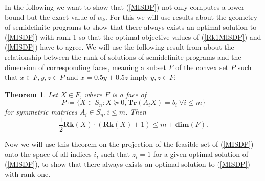 \documentclass[a4paper,11pt,1p]{elsarticle}
\newtheorem{thm}{Theorem}
\newcommand{\define}{\coloneqq}
\newcommand{\Tr}{\textbf{Tr}}
\newcommand{\Rk}{\textbf{Rk}}
\begin{document}
In the following we want to show that (\ref{MISDP}) not only computes a lower bound but the exact value of $\alpha_k$. For this we will use results about the geometry of semidefinite programs to show that there always exists an 
optimal solution to (\ref{MISDP}) with rank 1 so that the optimal objective values of (\ref{Rk1MISDP}) and (\ref{MISDP}) have to agree. We will use the following result from \cite{pat98} about the relationship between the rank of
solutions of semidefinite programs and the dimension of corresponding faces, meaning a subset $F$ of the convex set $P$ such that $x \in F, y, z \in P$ and $x = 0.5y + 0.5z$ imply $y,z \in F$:

\begin{thm}\label{patakiLemma}
 Let $X \in F$, where $F$ is a face of
 \begin{equation*}
 P \define \{X \in S_n : X \succeq 0, \Tr(A_i X) = b_i \ \forall i \leq m\}
 \end{equation*}
 for symmetric matrices $A_i \in S_n, i \leq m$. Then
 \begin{equation*}
  \frac{1}{2}\Rk(X)\cdot(\Rk(X)+1) \leq m + \textbf{dim}(F).
 \end{equation*}
\end{thm}

Now we will use this theorem on the projection of the feasible set of (\ref{MISDP}) onto the space of all indices $i$, such that $z_i = 1$ for a given optimal solution of (\ref{MISDP}), to show that there always exists an optimal 
solution to (\ref{MISDP}) with rank one.
\end{document}
